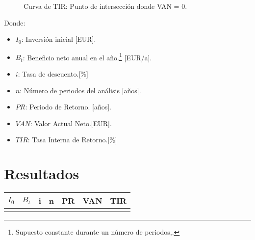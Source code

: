 \documentclass[conference,12pt]{IEEEtran}
\let\OldTextField\TextField
\renewcommand{\TextField}[2][]{%
  \raisebox{-0.3ex}{\OldTextField[height=.85em,  bordercolor={1 1 1}, backgroundcolor={1 1 1},#1]{#2}}%
}
\begin{document}
\begin{Form}
\begin{figure}[H]
    \caption{Curva de TIR: Punto de intersección donde VAN = 0.}
    \label{fig:tir}
\end{figure}


Donde:
\begin{itemize}
    \item $I_0$: Inversión inicial [EUR].
    \item $B_t$: Beneficio neto anual en el año.\footnote{Supuesto constante durante un número de periodos,.} [EUR/a].

    \item $i$: Tasa de descuento.[\%]
    \item $n$: Número de periodos del análisis [años].
    \item $PR$: Periodo de Retorno. [años].
    \item $VAN$: Valor Actual Neto.[EUR].
    \item $TIR$: Tasa Interna de Retorno.[\%]
\end{itemize}

\section{Resultados}


\begin{table}[H]
    \centering
    \begin{tabular}{
        |p{1.20cm}
        |p{1.2cm}
        |p{.5cm}
        |p{.5cm}
        |p{.7cm}
        |p{1.5cm}
        |p{.7cm}
        |}
    \hline
     $I_0$ &
     $B_t$ &
     i &
     n & 
     \cellcolor{gray!30}  PR &
     \cellcolor{gray!30}  VAN &
     \cellcolor{gray!30}  TIR \\ 
     \hline
     \TextField[name=I0,width=1.2cm]{} & 
     \TextField[name=Bt,width=1.2cm]{} &
     \TextField[name=i,width=.5cm]{} &
     \TextField[name=n,width=.5cm]{} &
     \TextField[name=PR,width=.7cm]{} &
     \TextField[name=VAN,width=1.5cm]{} &
     \TextField[name=TIR,width=.7cm]{} 
    \\ \hline
    \end{tabular}
\end{table}



\end{Form}
\end{document}
